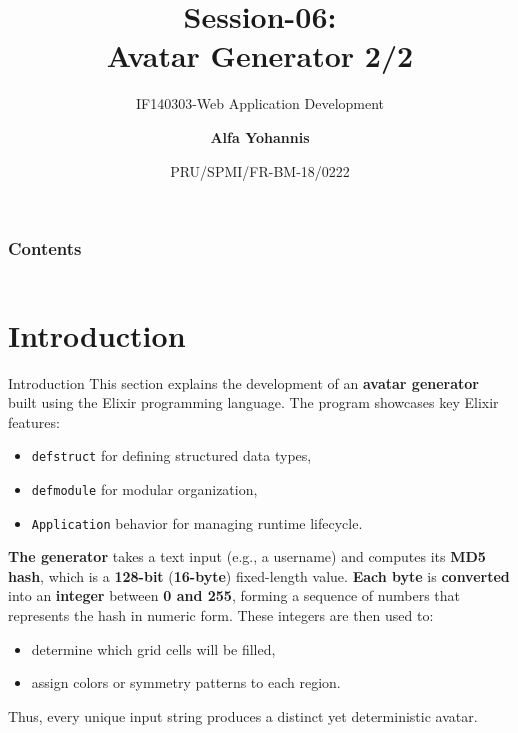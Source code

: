 \documentclass[aspectratio=169, table]{beamer}
\subtitle{IF140303-Web Application Development}
\title{Session-06:\\
\Huge{
Avatar Generator 2/2\\
\vspace{5pt}
}
}
\date[Serial]{\scriptsize{PRU/SPMI/FR-BM-18/0222}}
\author[Pradita]{\small{\textbf{Alfa Yohannis}}}
\begin{document}
	
	\frame{\titlepage}
	
		\begin{frame}[fragile]
		\frametitle{Contents}
		\vspace{20pt}
		\begin{columns}[t]
			\tableofcontents[sections={1-6}]
			
			\tableofcontents[sections={7-99}]
		\end{columns}
	\end{frame}


\section{Introduction}

\begin{frame}[fragile]{Introduction}
\vspace{20pt}
This section explains the development of an \textbf{avatar generator} built using the Elixir programming language.  
The program showcases key Elixir features:
\begin{itemize}
  \item \texttt{defstruct} for defining structured data types,
  \item \texttt{defmodule} for modular organization,
  \item \texttt{Application} behavior for managing runtime lifecycle.
\end{itemize}

\textbf{The generator} takes a text input (e.g., a username) and computes its \textbf{MD5 hash}, which is a \textbf{128-bit} (\textbf{16-byte}) fixed-length value.  
\textbf{Each byte} is \textbf{converted} into an \textbf{integer }between \textbf{0 and 255}, forming a sequence of numbers that represents the hash in numeric form.  
These integers are then used to:
\begin{itemize}
  \item determine which grid cells will be filled,
  \item assign colors or symmetry patterns to each region.
\end{itemize}
Thus, every unique input string produces a distinct yet deterministic avatar.
\end{frame}
\end{document}
